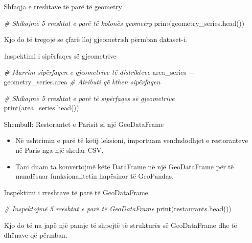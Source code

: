 \documentclass[
  ignorenonframetext,
]{beamer}
\newenvironment{Shaded}{\begin{snugshade}}{\end{snugshade}}
\newcommand{\BuiltInTok}[1]{#1}
\newcommand{\CommentTok}[1]{\textcolor[rgb]{0.56,0.35,0.01}{\textit{#1}}}
\newcommand{\NormalTok}[1]{#1}
\newcommand{\OperatorTok}[1]{\textcolor[rgb]{0.81,0.36,0.00}{\textbf{#1}}}
\begin{document}
\begin{frame}[fragile]{Shfaqja e rreshtave të parë të geometry}
\protect\hypertarget{shfaqja-e-rreshtave-tuxeb-paruxeb-tuxeb-geometry}{}

\begin{Shaded}
\begin{Highlighting}[]
\CommentTok{\# Shikojmë 5 rreshtat e parë të kolonës \textasciigrave{}geometry\textasciigrave{}}
\BuiltInTok{print}\NormalTok{(geometry\_series.head())}
\end{Highlighting}
\end{Shaded}

Kjo do të tregojë se çfarë lloj gjeometrish përmban dataset-i.
\end{frame}

\begin{frame}[fragile]{Inspektimi i sipërfaqes së gjeometrive}
\protect\hypertarget{inspektimi-i-sipuxebrfaqes-suxeb-gjeometrive}{}

\begin{Shaded}
\begin{Highlighting}[]
\CommentTok{\# Marrim sipërfaqen e gjeometrive të distrikteve}
\NormalTok{area\_series }\OperatorTok{=}\NormalTok{ geometry\_series.area  }\CommentTok{\# Atributi që kthen sipërfaqen}

\CommentTok{\# Shikojmë 5 rreshtat e parë të sipërfaqes së gjeometrive}
\BuiltInTok{print}\NormalTok{(area\_series.head())}
\end{Highlighting}
\end{Shaded}
\end{frame}

\begin{frame}{Shembull: Restorantet e Parisit si një GeoDataFrame}
\protect\hypertarget{shembull-restorantet-e-parisit-si-njuxeb-geodataframe}{}
\begin{itemize}
\item
  Në ushtrimin e parë të këtij leksioni, importuam vendndodhjet e
  restoranteve në Paris nga një skedar CSV.
\item
  Tani duam ta konvertojmë këtë DataFrame në një GeoDataFrame për të
  mundësuar funksionalitetin hapësinor të GeoPandas.
\end{itemize}
\end{frame}

\begin{frame}[fragile]{Inspektimi i rreshtave të parë të GeoDataFrame}
\protect\hypertarget{inspektimi-i-rreshtave-tuxeb-paruxeb-tuxeb-geodataframe}{}

\begin{Shaded}
\begin{Highlighting}[]
\CommentTok{\# Inspektojmë 5 rreshtat e parë të GeoDataFrame}
\BuiltInTok{print}\NormalTok{(restaurants.head())}
\end{Highlighting}
\end{Shaded}

Kjo do të na japë një pamje të shpejtë të strukturës së GeoDataFrame dhe
të dhënave që përmban.
\end{frame}
\end{document}

